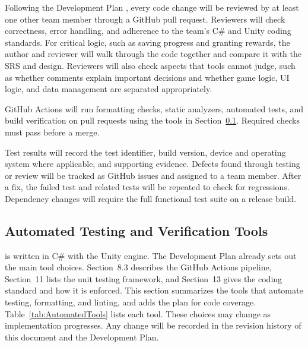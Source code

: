 \documentclass[10pt,titlepage]{article}
\begin{document}
Following the Development Plan \cite{DevPlan}, every code change will be
reviewed by at least one other team member through a GitHub pull request.
Reviewers will check correctness, error handling, and adherence to the team's
C\# and Unity coding standards. For critical logic, such as saving progress
and granting rewards, the author and reviewer will walk through the code
together and compare it with the SRS and design. Reviewers will also check
aspects that tools cannot judge, such as whether comments explain important
decisions and whether game logic, UI logic, and data management are separated
appropriately.

GitHub Actions will run formatting checks, static analyzers, automated tests,
and build verification on pull requests using the tools in
Section~\ref{sec:AutomatedTools}. Required checks must pass before a merge.

Test results will record the test identifier, build version, device and
operating system where applicable, and supporting evidence. Defects found
through testing or review will be tracked as GitHub issues and assigned to a
team member. After a fix, the failed test and related tests will be repeated
to check for regressions. Dependency changes will require the full functional
test suite on a release build.

\subsection{Automated Testing and Verification Tools}\label{sec:AutomatedTools}

\progname{} is written in C\# with the Unity engine. The Development Plan
\cite{DevPlan} already sets out the main tool choices. Section~8.3 describes the
GitHub Actions pipeline, Section~11 lists the unit testing framework, and
Section~13 gives the coding standard and how it is enforced. This section
summarizes the tools that automate testing, formatting, and linting, and adds
the plan for code coverage. Table~\ref{tab:AutomatedTools} lists each tool.
These choices may change as implementation progresses. Any change will be
recorded in the revision history of this document and the Development Plan.
\end{document}
